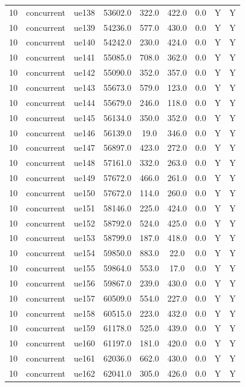 \begin{table}[ht]
\begin{tabular}{|c|c|c|c|c|c|c|c|c|}
10 & concurrent & ue138 & 53602.0 & 322.0 & 422.0 & 0.0 & Y & Y \\
10 & concurrent & ue139 & 54236.0 & 577.0 & 430.0 & 0.0 & Y & Y \\
10 & concurrent & ue140 & 54242.0 & 230.0 & 424.0 & 0.0 & Y & Y \\
10 & concurrent & ue141 & 55085.0 & 708.0 & 362.0 & 0.0 & Y & Y \\
10 & concurrent & ue142 & 55090.0 & 352.0 & 357.0 & 0.0 & Y & Y \\
10 & concurrent & ue143 & 55673.0 & 579.0 & 123.0 & 0.0 & Y & Y \\
10 & concurrent & ue144 & 55679.0 & 246.0 & 118.0 & 0.0 & Y & Y \\
10 & concurrent & ue145 & 56134.0 & 350.0 & 352.0 & 0.0 & Y & Y \\
10 & concurrent & ue146 & 56139.0 & 19.0 & 346.0 & 0.0 & Y & Y \\
10 & concurrent & ue147 & 56897.0 & 423.0 & 272.0 & 0.0 & Y & Y \\
10 & concurrent & ue148 & 57161.0 & 332.0 & 263.0 & 0.0 & Y & Y \\
10 & concurrent & ue149 & 57672.0 & 466.0 & 261.0 & 0.0 & Y & Y \\
10 & concurrent & ue150 & 57672.0 & 114.0 & 260.0 & 0.0 & Y & Y \\
10 & concurrent & ue151 & 58146.0 & 225.0 & 424.0 & 0.0 & Y & Y \\
10 & concurrent & ue152 & 58792.0 & 524.0 & 425.0 & 0.0 & Y & Y \\
10 & concurrent & ue153 & 58799.0 & 187.0 & 418.0 & 0.0 & Y & Y \\
10 & concurrent & ue154 & 59850.0 & 883.0 & 22.0 & 0.0 & Y & Y \\
10 & concurrent & ue155 & 59864.0 & 553.0 & 17.0 & 0.0 & Y & Y \\
10 & concurrent & ue156 & 59867.0 & 239.0 & 430.0 & 0.0 & Y & Y \\
10 & concurrent & ue157 & 60509.0 & 554.0 & 227.0 & 0.0 & Y & Y \\
10 & concurrent & ue158 & 60515.0 & 223.0 & 432.0 & 0.0 & Y & Y \\
10 & concurrent & ue159 & 61178.0 & 525.0 & 439.0 & 0.0 & Y & Y \\
10 & concurrent & ue160 & 61197.0 & 181.0 & 420.0 & 0.0 & Y & Y \\
10 & concurrent & ue161 & 62036.0 & 662.0 & 430.0 & 0.0 & Y & Y \\
10 & concurrent & ue162 & 62041.0 & 305.0 & 426.0 & 0.0 & Y & Y \\

\end{tabular}
\end{table}
